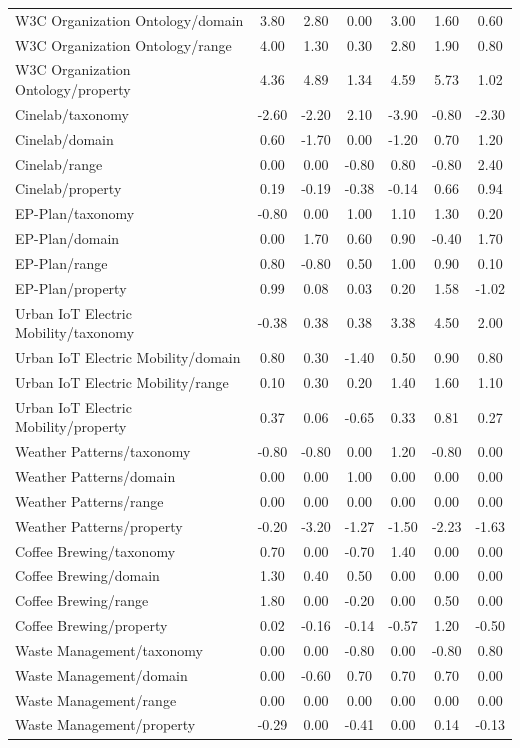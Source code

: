 \begin{tabular}{lcccccc}
W3C Organization Ontology/domain & 3.80 & 2.80 & 0.00 & 3.00 & 1.60 & 0.60 \\
W3C Organization Ontology/range & 4.00 & 1.30 & 0.30 & 2.80 & 1.90 & 0.80 \\
W3C Organization Ontology/property & 4.36 & 4.89 & 1.34 & 4.59 & 5.73 & 1.02 \\
Cinelab/taxonomy & -2.60 & -2.20 & 2.10 & -3.90 & -0.80 & -2.30 \\
Cinelab/domain & 0.60 & -1.70 & 0.00 & -1.20 & 0.70 & 1.20 \\
Cinelab/range & 0.00 & 0.00 & -0.80 & 0.80 & -0.80 & 2.40 \\
Cinelab/property & 0.19 & -0.19 & -0.38 & -0.14 & 0.66 & 0.94 \\
EP-Plan/taxonomy & -0.80 & 0.00 & 1.00 & 1.10 & 1.30 & 0.20 \\
EP-Plan/domain & 0.00 & 1.70 & 0.60 & 0.90 & -0.40 & 1.70 \\
EP-Plan/range & 0.80 & -0.80 & 0.50 & 1.00 & 0.90 & 0.10 \\
EP-Plan/property & 0.99 & 0.08 & 0.03 & 0.20 & 1.58 & -1.02 \\
Urban IoT Electric Mobility/taxonomy & -0.38 & 0.38 & 0.38 & 3.38 & 4.50 & 2.00 \\
Urban IoT Electric Mobility/domain & 0.80 & 0.30 & -1.40 & 0.50 & 0.90 & 0.80 \\
Urban IoT Electric Mobility/range & 0.10 & 0.30 & 0.20 & 1.40 & 1.60 & 1.10 \\
Urban IoT Electric Mobility/property & 0.37 & 0.06 & -0.65 & 0.33 & 0.81 & 0.27 \\
Weather Patterns/taxonomy & -0.80 & -0.80 & 0.00 & 1.20 & -0.80 & 0.00 \\
Weather Patterns/domain & 0.00 & 0.00 & 1.00 & 0.00 & 0.00 & 0.00 \\
Weather Patterns/range & 0.00 & 0.00 & 0.00 & 0.00 & 0.00 & 0.00 \\
Weather Patterns/property & -0.20 & -3.20 & -1.27 & -1.50 & -2.23 & -1.63 \\
Coffee Brewing/taxonomy & 0.70 & 0.00 & -0.70 & 1.40 & 0.00 & 0.00 \\
Coffee Brewing/domain & 1.30 & 0.40 & 0.50 & 0.00 & 0.00 & 0.00 \\
Coffee Brewing/range & 1.80 & 0.00 & -0.20 & 0.00 & 0.50 & 0.00 \\
Coffee Brewing/property & 0.02 & -0.16 & -0.14 & -0.57 & 1.20 & -0.50 \\
Waste Management/taxonomy & 0.00 & 0.00 & -0.80 & 0.00 & -0.80 & 0.80 \\
Waste Management/domain & 0.00 & -0.60 & 0.70 & 0.70 & 0.70 & 0.00 \\
Waste Management/range & 0.00 & 0.00 & 0.00 & 0.00 & 0.00 & 0.00 \\
Waste Management/property & -0.29 & 0.00 & -0.41 & 0.00 & 0.14 & -0.13 \\
\bottomrule
\end{tabular}
